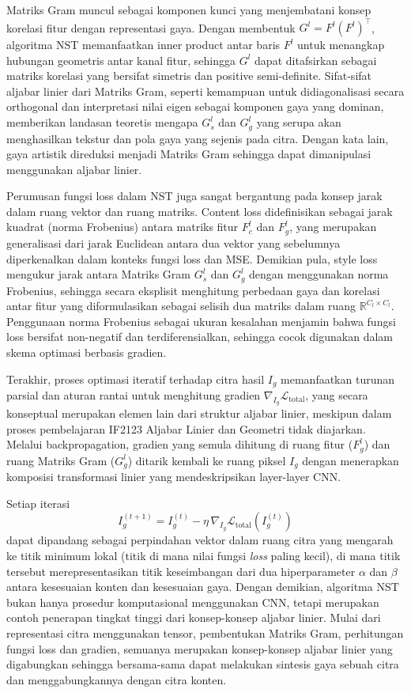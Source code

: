 Matriks Gram muncul sebagai komponen kunci yang menjembatani konsep korelasi fitur dengan representasi gaya. Dengan membentuk $G^l = F^l (F^l)^\top$, algoritma NST memanfaatkan inner product antar baris $F^l$ untuk menangkap hubungan geometris antar kanal fitur, sehingga $G^l$ dapat ditafsirkan sebagai matriks korelasi yang bersifat simetris dan positive semi-definite. Sifat-sifat aljabar linier dari Matriks Gram, seperti kemampuan untuk didiagonalisasi secara orthogonal dan interpretasi nilai eigen sebagai komponen gaya yang dominan, memberikan landasan teoretis mengapa $G_s^l$ dan $G_g^l$ yang serupa akan menghasilkan tekstur dan pola gaya yang sejenis pada citra. Dengan kata lain, gaya artistik direduksi menjadi Matriks Gram sehingga dapat dimanipulasi menggunakan aljabar linier.

Perumusan fungsi loss dalam NST juga sangat bergantung pada konsep jarak dalam ruang vektor dan ruang matriks. Content loss didefinisikan sebagai jarak kuadrat (norma Frobenius) antara matriks fitur $F_c^l$ dan $F_g^l$, yang merupakan generalisasi dari jarak Euclidean antara dua vektor yang sebelumnya diperkenalkan dalam konteks fungsi loss dan MSE. Demikian pula, style loss mengukur jarak antara Matriks Gram $G_s^l$ dan $G_g^l$ dengan menggunakan norma Frobenius, sehingga secara eksplisit menghitung perbedaan gaya dan korelasi antar fitur yang diformulasikan sebagai selisih dua matriks dalam ruang $\mathbb{R}^{C_l \times C_l}$. Penggunaan norma Frobenius sebagai ukuran kesalahan menjamin bahwa fungsi loss bersifat non-negatif dan terdiferensialkan, sehingga cocok digunakan dalam skema optimasi berbasis gradien.

Terakhir, proses optimasi iteratif terhadap citra hasil $I_g$ memanfaatkan turunan parsial dan aturan rantai untuk menghitung gradien $\nabla_{I_g} \mathcal{L}_{\text{total}}$, yang secara konseptual merupakan elemen lain dari struktur aljabar linier, meskipun dalam proses pembelajaran IF2123 Aljabar Linier dan Geometri tidak diajarkan. Melalui backpropagation, gradien yang semula dihitung di ruang fitur ($F_g^l$) dan ruang Matriks Gram ($G_g^l$) ditarik kembali ke ruang piksel $I_g$ dengan menerapkan komposisi transformasi linier yang mendeskripsikan layer-layer CNN. 

Setiap iterasi
$$
I_g^{(t+1)} = I_g^{(t)} - \eta \,\nabla_{I_g} \mathcal{L}_{\text{total}}(I_g^{(t)})
$$
dapat dipandang sebagai perpindahan vektor dalam ruang citra yang mengarah ke titik minimum lokal (titik di mana nilai fungsi \textit{loss} paling kecil), di mana titik tersebut merepresentasikan titik keseimbangan dari dua hiperparameter $\alpha$ dan $\beta$ antara kesesuaian konten dan kesesuaian gaya. Dengan demikian, algoritma NST bukan hanya prosedur komputasional menggunakan CNN, tetapi merupakan contoh penerapan tingkat tinggi dari konsep-konsep aljabar linier. Mulai dari representasi citra menggunakan tensor, pembentukan Matriks Gram, perhitungan fungsi loss dan gradien, semuanya merupakan konsep-konsep aljabar linier yang digabungkan sehingga bersama-sama dapat melakukan sintesis gaya sebuah citra dan menggabungkannya dengan citra konten. 
